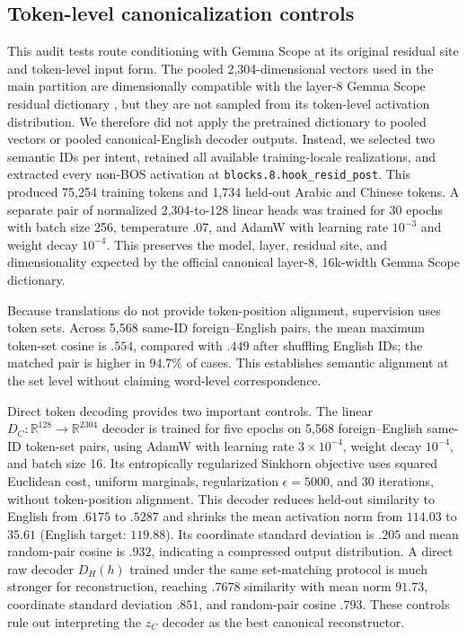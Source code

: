 \documentclass[11pt]{article}
\begin{document}
\subsection{Token-level canonicalization controls}
\label{app:scope-controls}
This audit tests route conditioning with Gemma Scope at its original residual site and token-level input form. The pooled 2,304-dimensional vectors used in the main partition are dimensionally compatible with the layer-8 Gemma Scope residual dictionary \citep{lieberum2024gemmascope}, but they are not sampled from its token-level activation distribution. We therefore did not apply the pretrained dictionary to pooled vectors or pooled canonical-English decoder outputs. Instead, we selected two semantic IDs per intent, retained all available training-locale realizations, and extracted every non-BOS activation at \texttt{blocks.8.hook\_resid\_post}. This produced 75,254 training tokens and 1,734 held-out Arabic and Chinese tokens. A separate pair of normalized 2,304-to-128 linear heads was trained for 30 epochs with batch size 256, temperature $.07$, and AdamW \citep{loshchilov2019adamw} with learning rate $10^{-3}$ and weight decay $10^{-4}$. This preserves the model, layer, residual site, and dimensionality expected by the official canonical layer-8, 16k-width Gemma Scope dictionary.

Because translations do not provide token-position alignment, supervision uses token sets. Across 5,568 same-ID foreign--English pairs, the mean maximum token-set cosine is $.554$, compared with $.449$ after shuffling English IDs; the matched pair is higher in $94.7\%$ of cases. This establishes semantic alignment at the set level without claiming word-level correspondence.

Direct token decoding provides two important controls. The linear $D_C:\mathbb{R}^{128}\rightarrow\mathbb{R}^{2304}$ decoder is trained for five epochs on 5,568 foreign--English same-ID token-set pairs, using AdamW with learning rate $3\times10^{-4}$, weight decay $10^{-4}$, and batch size 16. Its entropically regularized Sinkhorn objective \citep{cuturi2013sinkhorn} uses squared Euclidean cost, uniform marginals, regularization $\epsilon=5000$, and 30 iterations, without token-position alignment. This decoder reduces held-out similarity to English from $.6175$ to $.5287$ and shrinks the mean activation norm from $114.03$ to $35.61$ (English target: $119.88$). Its coordinate standard deviation is $.205$ and mean random-pair cosine is $.932$, indicating a compressed output distribution. A direct raw decoder $D_H(h)$ trained under the same set-matching protocol is much stronger for reconstruction, reaching $.7678$ similarity with mean norm $91.73$, coordinate standard deviation $.851$, and random-pair cosine $.793$. These controls rule out interpreting the $z_C$ decoder as the best canonical reconstructor.
\end{document}
